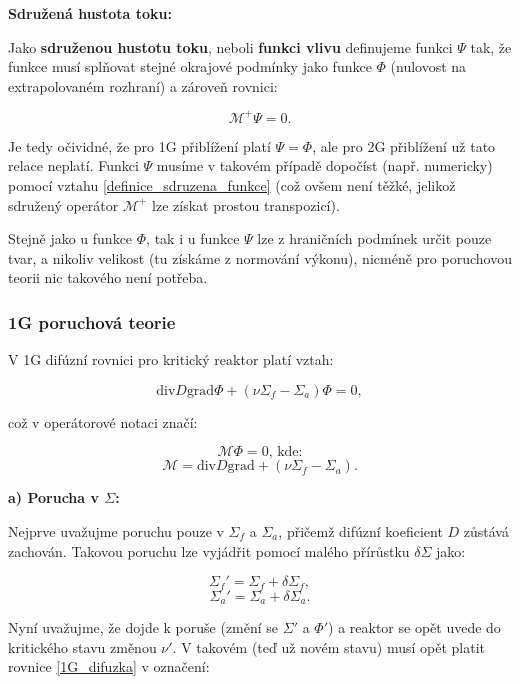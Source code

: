 \textbf{Sdružená hustota toku:}

Jako \textbf{sdruženou hustotu toku}, neboli \textbf{funkci vlivu} definujeme funkci $\Psi$ tak, že funkce musí splňovat stejné okrajové podmínky jako funkce $\Phi$ (nulovost na extrapolovaném rozhraní) a zároveň rovnici:

\begin{equation}
  \boxed{
  \mathcal{M}^+ \Psi = 0.
  \label{definice_sdruzena_funkce}}
\end{equation}

Je tedy očividné, že pro 1G přiblížení platí $\Psi = \Phi$, ale pro 2G přiblížení už tato relace neplatí. Funkci $\Psi$ musíme v takovém případě dopočíst (např. numericky) pomocí vztahu \eqref{definice_sdruzena_funkce} (což ovšem není těžké, jelikož sdružený operátor $\mathcal{M}^+$ lze získat prostou transpozicí).

Stejně jako u funkce $\Phi$, tak i u funkce $\Psi$ lze z hraničních podmínek určit pouze tvar, a nikoliv velikost (tu získáme z normování výkonu), nicméně pro poruchovou teorii nic takového není potřeba.

\subsubsection{1G poruchová teorie}

V 1G difúzní rovnici pro kritický reaktor platí vztah:

\begin{equation}
  \text{div} D \text{grad} \Phi + (\nu \Sigma_f - \Sigma_a) \Phi = 0,
  \label{1G_difuzka}
\end{equation}

což v operátorové notaci značí:

$$ \mathcal{M} \Phi = 0 \text{, kde:} $$
$$ \mathcal{M} = \text{div} D \text{grad} + (\nu \Sigma_f - \Sigma_a). $$

\textbf{a) Porucha v $\Sigma$:}

Nejprve uvažujme poruchu pouze v $\Sigma_f$ a $\Sigma_a$, přičemž difúzní koeficient $D$ zůstává zachován. Takovou poruchu lze vyjádřit pomocí malého přírůstku $\delta \Sigma$ jako:

$$ \Sigma_f' = \Sigma_f + \delta \Sigma_f, $$
$$ \Sigma_a' = \Sigma_a + \delta \Sigma_a. $$

Nyní uvažujme, že dojde k poruše (změní se $\Sigma'$ a $\Phi'$) a reaktor se opět uvede do kritického stavu změnou $\nu'$. V takovém (teď už novém stavu) musí opět platit rovnice \eqref{1G_difuzka} v označení:


